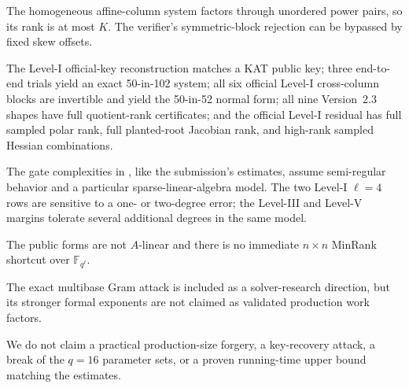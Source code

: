 \documentclass[11pt]{article}
\newcommand{\F}{\mathbb F}
\begin{document}
\begin{description}[leftmargin=0pt]
\item[Proved algebraically.] The homogeneous affine-column system factors through unordered power pairs, so its rank is at most $K$.  The verifier's symmetric-block rejection can be bypassed by fixed skew offsets.
\item[Checked computationally.] The Level-I official-key reconstruction matches a KAT public key; three end-to-end trials yield an exact 50-in-102 system; all six official Level-I cross-column blocks are invertible and yield the 50-in-52 normal form; all nine Version~2.3 shapes have full quotient-rank certificates; and the official Level-I residual has full sampled polar rank, full planted-root Jacobian rank, and high-rank sampled Hessian combinations.
\item[Estimated heuristically.] The gate complexities in , like the submission's estimates, assume semi-regular behavior and a particular sparse-linear-algebra model.  The two Level-I $\ell=4$ rows are sensitive to a one- or two-degree error; the Level-III and Level-V margins tolerate several additional degrees in the same model.
\item[Audited negative result.] The public forms are not $A$-linear and there is no immediate $n\times n$ MinRank shortcut over $\F_{q^\ell}$.
\item[Preliminary extension.] The exact multibase Gram attack is included as a solver-research direction, but its stronger formal exponents are not claimed as validated production work factors.
\item[Not claimed.] We do not claim a practical production-size forgery, a key-recovery attack, a break of the $q=16$ parameter sets, or a proven running-time upper bound matching the estimates.
\end{description}
\end{document}
